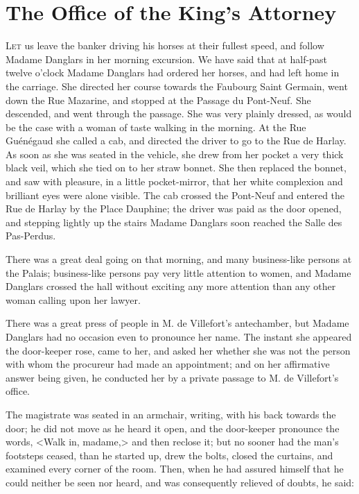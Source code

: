 \chapter{The Office of the King's Attorney}

 \lettrine{L}{et} us leave the banker driving his horses at their fullest speed, and follow Madame Danglars in her morning excursion. We have said that at half-past twelve o'clock Madame Danglars had ordered her horses, and had left home in the carriage. She directed her course towards the Faubourg Saint Germain, went down the Rue Mazarine, and stopped at the Passage du Pont-Neuf. She descended, and went through the passage. She was very plainly dressed, as would be the case with a woman of taste walking in the morning. At the Rue Guénégaud she called a cab, and directed the driver to go to the Rue de Harlay. As soon as she was seated in the vehicle, she drew from her pocket a very thick black veil, which she tied on to her straw bonnet. She then replaced the bonnet, and saw with pleasure, in a little pocket-mirror, that her white complexion and brilliant eyes were alone visible. The cab crossed the Pont-Neuf and entered the Rue de Harlay by the Place Dauphine; the driver was paid as the door opened, and stepping lightly up the stairs Madame Danglars soon reached the Salle des Pas-Perdus. 

 There was a great deal going on that morning, and many business-like persons at the Palais; business-like persons pay very little attention to women, and Madame Danglars crossed the hall without exciting any more attention than any other woman calling upon her lawyer. 

 There was a great press of people in M. de Villefort's antechamber, but Madame Danglars had no occasion even to pronounce her name. The instant she appeared the door-keeper rose, came to her, and asked her whether she was not the person with whom the procureur had made an appointment; and on her affirmative answer being given, he conducted her by a private passage to M. de Villefort's office. 

 The magistrate was seated in an armchair, writing, with his back towards the door; he did not move as he heard it open, and the door-keeper pronounce the words, <Walk in, madame,> and then reclose it; but no sooner had the man's footsteps ceased, than he started up, drew the bolts, closed the curtains, and examined every corner of the room. Then, when he had assured himself that he could neither be seen nor heard, and was consequently relieved of doubts, he said: 

